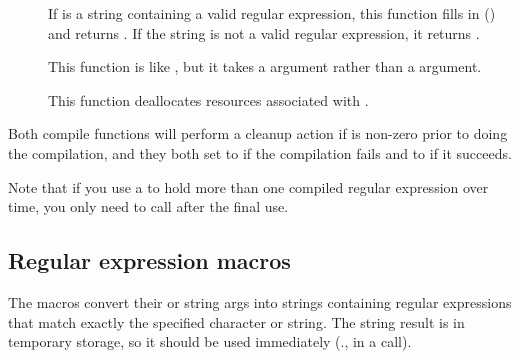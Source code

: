 \begin{description}
\item[\small{}] 
  If  is a string containing a valid regular
 expression, this function fills in () and returns .
 If the string is not a valid regular expression, it returns .

\item[\small{}]
This function is like , but it takes a
 argument rather than a  argument.

\item[\small{}]
This function deallocates resources associated with .
\end{description}

Both compile functions will perform a cleanup action if  is
non-zero prior to doing the compilation, and they both set 
to  if the compilation fails and to  if it succeeds.  

Note that if you use a  to hold more than one compiled
regular expression over time, you only need to call 
after the final use.  

\subsection{Regular expression macros}

The  macros convert their  or string args into
strings containing regular expressions that match exactly the
specified character or string.  The string result is in temporary
 storage, so it should be used immediately (\eg{}., in a
 call).

